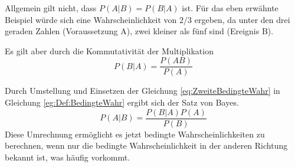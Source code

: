 Allgemein gilt nicht, dass $P(A|B) = P(B|A)$ ist. Für das eben
erwähnte Beispiel würde sich eine Wahrscheinlichkeit von $2/3$
ergeben, da unter den drei geraden Zahlen (Voraussetzung A), zwei
kleiner als fünf sind (Ereignis B).

Es gilt aber durch die Kommutativität der Multiplikation
\begin{equation}\label{eq:ZweiteBedingteWahr}
    P(B|A) = \frac{P(AB)}{P(A)}
\end{equation}

Durch Umstellung und Einsetzen der Gleichung
\ref{eq:ZweiteBedingteWahr} in Gleichung \ref{eg:Def:BedingteWahr}
ergibt sich der Satz von Bayes.
\begin{equation}\label{eq:Def:SatzvonBayse}
    P(A|B) = \frac{P(B|A)P(A)}{P(B)}
\end{equation}
Diese Umrechnung ermöglicht es jetzt bedingte Wahrscheinlichkeiten
zu berechnen, wenn nur die bedingte Wahrscheinlichkeit in der
anderen Richtung bekannt ist, was häufig vorkommt.

%
%

